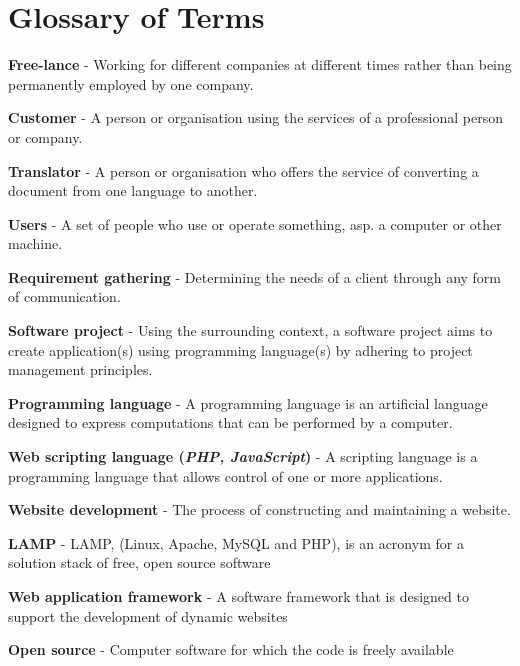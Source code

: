 \documentclass{l3proj}
\begin{document}




\appendix
\chapter{Glossary of Terms}
\label{chap:gloss}

\begin{itemize}
\small{
\item{\textbf{Free-lance} - Working for different companies at different times rather than being permanently employed by one company.} 
\item{\textbf{Customer} - A person or organisation using the services of a professional person or company.}
\item{\textbf{Translator} - A person or organisation who offers the service of converting a document from one language to another.}
\item{\textbf{Users} - A set of people who use or operate something, asp. a computer or other machine.}
\item{\textbf{Requirement gathering} - Determining the needs of a client through any form of communication.}
\item{\textbf{Software project} - Using the surrounding context, a software project aims to create application(s) using programming language(s) by adhering
to project management principles.}
\item{\textbf{Programming language} - A programming language is an artificial
language designed to express computations that can be performed by a computer.}
\item{\textbf{Web scripting language (\textit{PHP, JavaScript})} - A scripting language is a programming language that allows control of one or more
applications.}
\item{\textbf{Website development} - The process of constructing and maintaining a website.}
\item{\textbf{LAMP} - LAMP, (Linux, Apache, MySQL and PHP), is an acronym for a solution stack of free, open source software}
\item{\textbf{Web application framework} - A software framework that is designed to support the development of dynamic websites }
\item{\textbf{Open source} - Computer software for which the code is freely available }
}
\end{itemize}
\end{document}
